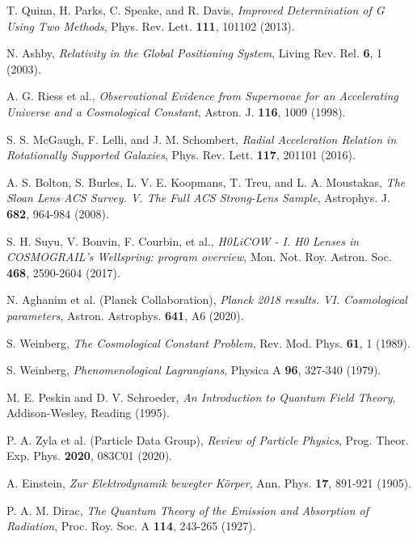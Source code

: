 \documentclass[12pt,a4paper]{article}
\begin{document}
\begin{thebibliography}{99}
		 T. Quinn, H. Parks, C. Speake, and R. Davis, \textit{Improved Determination of G Using Two Methods}, Phys. Rev. Lett. \textbf{111}, 101102 (2013).
		
		 N. Ashby, \textit{Relativity in the Global Positioning System}, Living Rev. Rel. \textbf{6}, 1 (2003).
		
		 A. G. Riess et al., \textit{Observational Evidence from Supernovae for an Accelerating Universe and a Cosmological Constant}, Astron. J. \textbf{116}, 1009 (1998).
		
		 S. S. McGaugh, F. Lelli, and J. M. Schombert, \textit{Radial Acceleration Relation in Rotationally Supported Galaxies}, Phys. Rev. Lett. \textbf{117}, 201101 (2016).
		
		 A. S. Bolton, S. Burles, L. V. E. Koopmans, T. Treu, and L. A. Moustakas, \textit{The Sloan Lens ACS Survey. V. The Full ACS Strong-Lens Sample}, Astrophys. J. \textbf{682}, 964-984 (2008).
		
		 S. H. Suyu, V. Bonvin, F. Courbin, et al., \textit{H0LiCOW - I. H0 Lenses in COSMOGRAIL's Wellspring: program overview}, Mon. Not. Roy. Astron. Soc. \textbf{468}, 2590-2604 (2017).
		
		 N. Aghanim et al. (Planck Collaboration), \textit{Planck 2018 results. VI. Cosmological parameters}, Astron. Astrophys. \textbf{641}, A6 (2020).
		
		 S. Weinberg, \textit{The Cosmological Constant Problem}, Rev. Mod. Phys. \textbf{61}, 1 (1989).
		
		 S. Weinberg, \textit{Phenomenological Lagrangians}, Physica A \textbf{96}, 327-340 (1979).
		
		 M. E. Peskin and D. V. Schroeder, \textit{An Introduction to Quantum Field Theory}, Addison-Wesley, Reading (1995).
		
		 P. A. Zyla et al. (Particle Data Group), \textit{Review of Particle Physics}, Prog. Theor. Exp. Phys. \textbf{2020}, 083C01 (2020).
		
		 A. Einstein, \textit{Zur Elektrodynamik bewegter Körper}, Ann. Phys. \textbf{17}, 891-921 (1905).
		
		 P. A. M. Dirac, \textit{The Quantum Theory of the Emission and Absorption of Radiation}, Proc. Roy. Soc. A \textbf{114}, 243-265 (1927).
		

\end{thebibliography}
\end{document}
